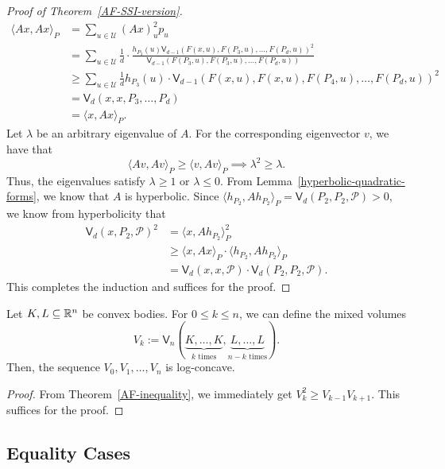 \documentclass{puthesis-UG}
\begin{document}
\begin{proof}[Proof of Theorem~\ref{AF-SSI-version}]
\begin{align*}
		\langle Ax, Ax \rangle_P & = \sum_{u \in \mathcal{U}} (Ax)_u^2 p_u \\
		& = \sum_{u \in \mathcal{U}} \frac{1}{d} \cdot \frac{h_{P_3}(u) \mathsf{V}_{d-1}(F(x, u), F(P_3, u), \ldots, F(P_d, u))^2}{\mathsf{V}_{d-1}(F(P_3, u), F(P_3, u), \ldots, F(P_d, u))} \\
		& \geq \sum_{u \in \mathcal{U}} \frac{1}{d} h_{P_3}(u) \cdot \mathsf{V}_{d-1} (F(x, u), F(x, u), F(P_4, u), \ldots, F(P_d, u))^2 \\
		& = \mathsf{V}_d (x, x, P_3, \ldots, P_d) \\
		& = \langle x, Ax \rangle_P.
	\end{align*}
	Let $\lambda$ be an arbitrary eigenvalue of $A$. For the corresponding eigenvector $v$, we have that 
	\[
		\langle Av, Av \rangle_P \geq \langle v, Av \rangle_P \implies \lambda^2 \geq \lambda. 
	\]
	Thus, the eigenvalues satisfy $\lambda \geq 1$ or $\lambda \leq 0$. From Lemma~\ref{hyperbolic-quadratic-forms}, we know that $A$ is hyperbolic. Since $\langle h_{P_2}, A h_{P_2} \rangle_P = \mathsf{V}_d (P_2, P_2, \mathcal{P}) > 0$, we know from hyperbolicity that 
	\begin{align*}
		\mathsf{V}_d (x, P_2, \mathcal{P})^2 & = \langle x, A h_{P_2} \rangle_P^2 \\
		& \geq \langle x, Ax \rangle_P \cdot \langle h_{P_2}, Ah_{P_2} \rangle_P \\
		& = \mathsf{V}_d(x, x, \mathcal{P}) \cdot \mathsf{V}_d (P_2, P_2, \mathcal{P}).
	\end{align*}
	This completes the induction and suffices for the proof. 
\end{proof}



\begin{cor} \label{AF-log-concavity}
	Let $K, L \subseteq \mathbb{R}^n$ be convex bodies. For $0 \leq k \leq n$, we can define the mixed volumes
	\[
		V_k := \mathsf{V}_n (\underbrace{K, \ldots, K}_{k \text{ times}}, \underbrace{L, \dots, L}_{n-k \text{ times}}).
	\]
	Then, the sequence $V_0, V_1, \ldots, V_n$ is log-concave. 
\end{cor}

\begin{proof}
	From Theorem~\ref{AF-inequality}, we immediately get $V_k^2 \geq V_{k-1}V_{k+1}$. This suffices for the proof. 
\end{proof}

\subsection{Equality Cases} \label{sec:AF-equality-cases}
\end{document}
